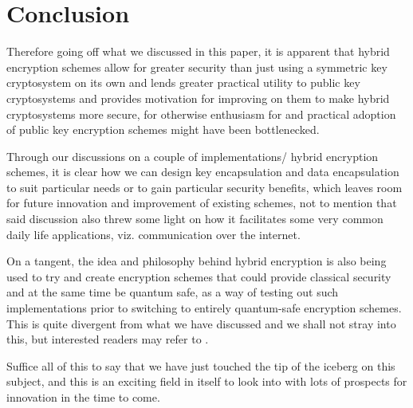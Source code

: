 \section{Conclusion}

\label{sec:conclusion}

Therefore going off what we discussed in this paper, it is apparent that hybrid encryption schemes allow for greater security than just using a symmetric key cryptosystem on its own and lends greater practical utility to public key cryptosystems and provides motivation for improving on them to make hybrid cryptosystems more secure, for otherwise enthusiasm for and practical adoption of public key encryption schemes might have been bottlenecked.

Through our discussions on a couple of implementations/ hybrid encryption schemes, it is clear how we can design key encapsulation and data encapsulation to suit particular needs or to gain particular security benefits, which leaves room for future innovation and improvement of existing schemes, not to mention that said discussion also threw some light on how it facilitates some very common daily life applications, viz. communication over the internet.

On a tangent, the idea and philosophy behind hybrid encryption is also being used to try and create encryption schemes that could provide classical security and at the same time be quantum safe, as a way of testing out such implementations prior to switching to entirely quantum-safe encryption schemes. This is quite divergent from what we have discussed and we shall not stray into this, but interested readers may refer to \cite{csahybrid}.

Suffice all of this to say that we have just touched the tip of the iceberg on this subject, and this is an exciting field in itself to look into with lots of prospects for innovation in the time to come.
